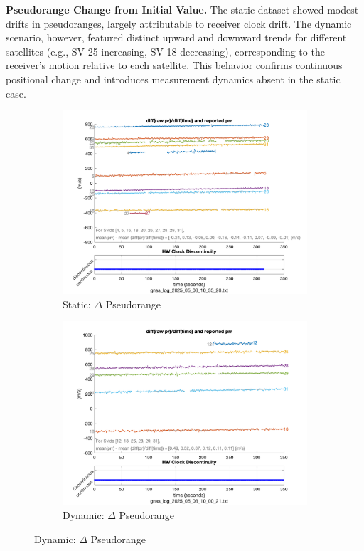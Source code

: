         \vspace{0.5em}
        \textbf{Pseudorange Change from Initial Value.} 
        The static dataset showed modest drifts in pseudoranges, largely attributable to receiver clock drift. The dynamic scenario, however, featured distinct upward and downward trends for different satellites (e.g., SV 25 increasing, SV 18 decreasing), corresponding to the receiver's motion relative to each satellite. This behavior confirms continuous positional change and introduces measurement dynamics absent in the static case.
    
        \begin{figure}[H]
            \centering
            \begin{subfigure}{0.23\textwidth}
                \includegraphics[width=\textwidth]{images/Monte_Cappuccini/filtered/Samsung_A51_Monte_Cappuccini_fig2.png}
                \caption{Static: $\Delta$ Pseudorange}
            \end{subfigure}
            \hfill
            \begin{subfigure}{0.23\textwidth}
                \includegraphics[width=\textwidth]{images/Tram_15_trip_Castello_to_Pescatore/filtered/Samsung_A51_Tram_15_trip_Castello_to_Pescatore_fig2.png}
                \caption{Dynamic: $\Delta$ Pseudorange}
            \end{subfigure}
        \end{figure}
    
